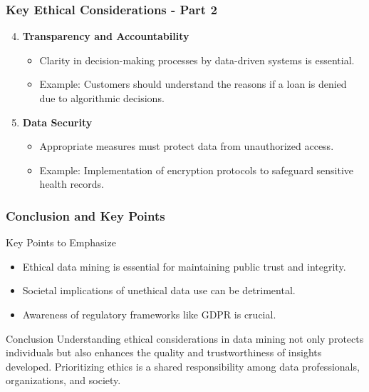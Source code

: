 \documentclass[aspectratio=169]{beamer}
\begin{document}
\begin{frame}[fragile]
    \frametitle{Key Ethical Considerations - Part 2}
    \begin{enumerate}
        \setcounter{enumi}{3} %
        \item \textbf{Transparency and Accountability}
            \begin{itemize}
                \item Clarity in decision-making processes by data-driven systems is essential.
                \item Example: Customers should understand the reasons if a loan is denied due to algorithmic decisions.
            \end{itemize}

        \item \textbf{Data Security}
            \begin{itemize}
                \item Appropriate measures must protect data from unauthorized access.
                \item Example: Implementation of encryption protocols to safeguard sensitive health records.
            \end{itemize}
    \end{enumerate}
\end{frame}

\begin{frame}[fragile]
    \frametitle{Conclusion and Key Points}
    \begin{block}{Key Points to Emphasize}
        \begin{itemize}
            \item Ethical data mining is essential for maintaining public trust and integrity.
            \item Societal implications of unethical data use can be detrimental.
            \item Awareness of regulatory frameworks like GDPR is crucial.
        \end{itemize}
    \end{block}
    
    \begin{block}{Conclusion}
        Understanding ethical considerations in data mining not only protects individuals but also enhances the quality and trustworthiness of insights developed. Prioritizing ethics is a shared responsibility among data professionals, organizations, and society.
    \end{block}
\end{frame}
\end{document}

